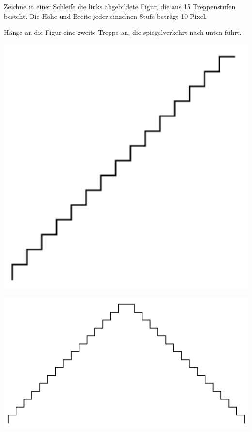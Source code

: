 \begin{compactenum}[a)]

\item Zeichne in einer Schleife die links abgebildete Figur, die aus 15
 Treppenstufen besteht. Die Höhe und Breite jeder einzelnen Stufe beträgt 10
 Pixel.

\item Hänge an die Figur eine zweite Treppe an, die spiegelverkehrt nach unten
 führt.
\end{compactenum}

\hspace{5mm}
\begin{minipage}{0.3\textwidth}
\includegraphics[width=1.0\textwidth]{./inf/SEKII/05_Java_TurtleGrafik/Aufgabe5a.png}
\end{minipage}\hfill
\begin{minipage}{0.6\textwidth}
\includegraphics[width=1.0\textwidth]{./inf/SEKII/05_Java_TurtleGrafik/Aufgabe5b.png}
\end{minipage}
 
